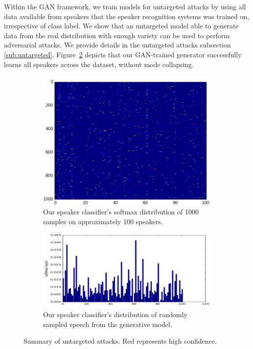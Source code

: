 Within the GAN framework, we train models for untargeted attacks by using all
data available from speakers that the speaker recognition systems was trained on, 
irrespective of class label. We show that an untargeted model able to generate 
data from the real distribution with enough variety can be used to perform 
adversarial attacks. We provide details in the untargeted attacks 
subsection \ref{sub:untargeted}. Figure~\ref{fig:histogram_untargeted} depicts
that our GAN-trained generator successfully learns all speakers across the
dataset, without mode collapsing.
\begin{figure}[t]
    \centering
    \begin{subfigure}[b]{0.4\textwidth}
        \includegraphics[width=\textwidth]{./fig/conf_mat_untargeted.png}
        \caption{Our speaker classifier's softmax distribution of 1000 samples 
        on approximately 100 speakers.}
        \label{fig:cm_untargeted}
    \end{subfigure}
    \qquad
    \begin{subfigure}[b]{0.4\textwidth}
        \includegraphics[width=\textwidth]{./fig/histogram_untargeted.png}
        \caption{Our speaker classifier's distribution of randomly sampled 
        speech from the generative model.}
        \label{fig:histogram_untargeted}
    \end{subfigure}
    \caption{Summary of untargeted attacks. Red represents high confidence.}
    \label{fig:histogram_summary}
\end{figure}

